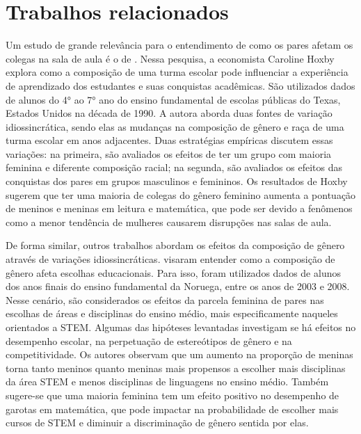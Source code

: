 \chapter{Trabalhos relacionados}

Um estudo de grande relevância para o entendimento de como os pares afetam os colegas na sala de aula é o de \citet{Hoxby-2000}. Nessa pesquisa, a economista Caroline Hoxby explora como a composição de uma turma escolar pode influenciar a experiência de aprendizado dos estudantes e suas conquistas acadêmicas. São utilizados dados de alunos do 4° ao 7° ano do ensino fundamental de escolas públicas do Texas, Estados Unidos na década de 1990. A autora aborda duas fontes de variação idiossincrática, sendo elas as mudanças na composição de gênero e raça de uma turma escolar em anos adjacentes. Duas estratégias empíricas discutem essas variações: na primeira, são avaliados os efeitos de ter um grupo com maioria feminina e diferente composição racial; na segunda, são avaliados os efeitos das conquistas dos pares em grupos masculinos e femininos. Os resultados de Hoxby sugerem que ter uma maioria de colegas do gênero feminino aumenta a pontuação de meninos e meninas em leitura e matemática, que pode ser devido a fenômenos como a menor tendência de mulheres causarem disrupções nas salas de aula.

De forma similar, outros trabalhos abordam os efeitos da composição de gênero através de variações idiossincráticas. \citet{Schne2019} visaram entender como a composição de gênero afeta escolhas educacionais. Para isso, foram utilizados dados de alunos dos anos finais do ensino fundamental da Noruega, entre os anos de 2003 e 2008. Nesse cenário, são considerados os efeitos da parcela feminina de pares nas escolhas de áreas e disciplinas do ensino médio, mais especificamente naqueles orientados a STEM. Algumas das hipóteses levantadas investigam se há efeitos no desempenho escolar, na perpetuação de estereótipos de gênero e na competitividade. Os autores observam que um aumento na proporção de meninas torna tanto meninos quanto meninas mais propensos a escolher mais disciplinas da área STEM e menos disciplinas de linguagens no ensino médio. Também sugere-se que uma maioria feminina tem um efeito positivo no desempenho de garotas em matemática, que pode impactar na probabilidade de escolher mais cursos de STEM e diminuir a discriminação de gênero sentida por elas. 

